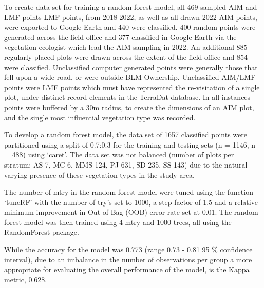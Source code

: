\documentclass[
]{article}
\begin{document}
To create data set for training a random forest model, all 469 sampled
AIM and LMF points LMF points, from 2018-2022, as well as all drawn 2022
AIM points, were exported to Google Earth and 440 were classified. 400
random points were generated across the field office and 377 classified
in Google Earth via the vegetation ecologist which lead the AIM sampling
in 2022. An additional 885 regularly placed plots were drawn across the
extent of the field office and 854 were classified. Unclassified
computer generated points were generally those that fell upon a wide
road, or were outside BLM Ownership. Unclassified AIM/LMF points were
LMF points which must have represented the re-visitation of a single
plot, under distinct record elements in the TerraDat database. In all
instances points were buffered by a 30m radius, to create the dimensions
of an AIM plot, and the single most influential vegetation type was
recorded.

To develop a random forest model, the data set of 1657 classified points
were partitioned using a split of 0.7:0.3 for the training and testing
sets (n = 1146, n = 488) using `caret'. The data set was not balanced
(number of plots per stratum: AS-7, MC-6, MMS-124, PJ-631, SD-235,
SS-143) due to the natural varying presence of these vegetation types in
the study area.

The number of mtry in the random forest model were tuned using the
function `tuneRF' with the number of try's set to 1000, a step factor of
1.5 and a relative minimum improvement in Out of Bag (OOB) error rate
set at 0.01. The random forest model was then trained using 4 mtry and
1000 trees, all using the RandomForest package.

While the accuracy for the model was 0.773 (range 0.73 - 0.81 95 \%
confidence interval), due to an imbalance in the number of observations
per group a more appropriate for evaluating the overall performance of
the model, is the Kappa metric, 0.628.
\end{document}

